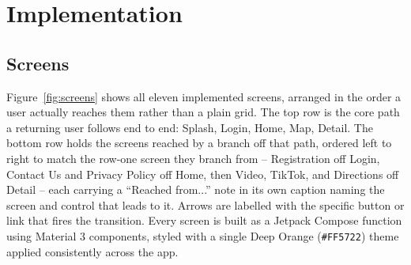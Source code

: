 \documentclass[12pt, a4paper]{article}
\begin{document}
\section{Implementation}

\subsection{Screens}

Figure~\ref{fig:screens} shows all eleven implemented screens, arranged in the order a user actually reaches them rather than a plain grid. The top row is the core path a returning user follows end to end: Splash, Login, Home, Map, Detail. The bottom row holds the screens reached by a branch off that path, ordered left to right to match the row-one screen they branch from -- Registration off Login, Contact Us and Privacy Policy off Home, then Video, TikTok, and Directions off Detail -- each carrying a ``Reached from...'' note in its own caption naming the screen and control that leads to it. Arrows are labelled with the specific button or link that fires the transition. Every screen is built as a Jetpack Compose function using Material 3 components, styled with a single Deep Orange (\texttt{\#FF5722}) theme applied consistently across the app.
\end{document}
